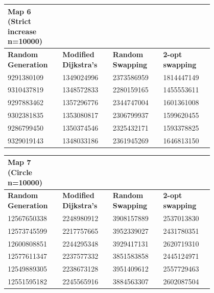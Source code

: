 \documentclass{article}
\begin{document}
\begin{table}[H]
    \centering
    \begin{tabular}{|p{0.2\linewidth}|p{0.2\linewidth}|p{0.2\linewidth}|p{0.2\linewidth}|}
    \hline
        \textbf{Map 6 (Strict increase n=10000)} & ~ & ~ & ~ \\ \hline
        \textbf{Random Generation} & \textbf{Modified Dijkstra's} & \textbf{Random Swapping} & \textbf{2-opt swapping} \\ \hline
        9291380109 & 1349024996 & 2373586959 & 1814447149 \\ \hline
        9310437819 & 1348572833 & 2280159165 & 1455553611 \\ \hline
        9297883462 & 1357296776 & 2344747004 & 1601361008 \\ \hline
        9302381835 & 1353080817 & 2306799937 & 1599620455 \\ \hline
        9286799450 & 1350374546 & 2325432171 & 1593378825 \\ \hline
        9329019143 & 1348033186 & 2361945269 & 1646813150 \\ \hline
    \end{tabular}
\end{table}

\begin{table}[H]
    \centering
    \begin{tabular}{|p{0.2\linewidth}|p{0.2\linewidth}|p{0.2\linewidth}|p{0.2\linewidth}|}
    \hline
        \textbf{Map 7 (Circle n=10000)} & ~ & ~ & ~ \\ \hline
        \textbf{Random Generation} & \textbf{Modified Dijkstra's} & \textbf{Random Swapping} & \textbf{2-opt swapping} \\ \hline
        12567650338 & 2248980912 & 3908157889 & 2537013830 \\ \hline
        12573745599 & 2217757665 & 3952339027 & 2431780351 \\ \hline
        12600808851 & 2244295348 & 3929417131 & 2620719310 \\ \hline
        12577611347 & 2237577332 & 3851583858 & 2445124971 \\ \hline
        12549889305 & 2238673128 & 3951409612 & 2557729463 \\ \hline
        12551595182 & 2245565916 & 3884563307 & 2602087504 \\ \hline
    \end{tabular}
\end{table}
\end{document}

